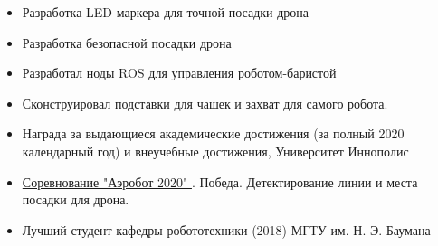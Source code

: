 \documentclass[10pt,a4paper,ragged2e]{altacv}
\begin{document}

\begin{fullwidth}
\makecvheader
\end{fullwidth}



\begin{itemize}
\item Разработка LED маркера для точной посадки дрона
\smallskip
\item Разработка безопасной посадки дрона
\end{itemize}

\divider

\begin{itemize}
\item Разработал ноды ROS для управления роботом-баристой
\smallskip
\item Сконструировал подставки для чашек и захват для самого робота.
\end{itemize}


\smallskip
\begin{itemize}
\item Награда за выдающиеся академические достижения (за полный 2020 календарный год) и внеучебные достижения, Университет Иннополис
\smallskip
\item \href{https://aerobot2020.ru/}{Соревнование "Аэробот 2020" \faMousePointer}. Победа. Детектирование линии и места посадки для дрона.
\smallskip
\item Лучший студент кафедры робототехники (2018) МГТУ им. Н. Э. Баумана
\smallskip
\end{itemize}
\end{document}
